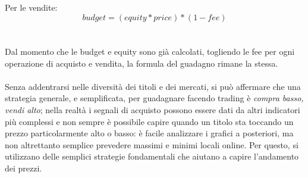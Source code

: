 \documentclass[a4paper,12pt]{report}
\begin{document}
\\~\\
Per le vendite:\\
\begin{equation}
budget=(equity*price)*(1-fee)
\end{equation}
\\~\\ Dal momento che le budget e equity sono già calcolati, togliendo le fee per ogni operazione di acquisto e vendita, la formula del guadagno rimane la stessa.\\~\\
Senza addentrarsi nelle diversità dei titoli e dei mercati, si può affermare che una strategia generale, e semplificata, per guadagnare facendo trading è \textit{compra basso, vendi alto}; nella realtà i segnali di acquisto possono essere dati da altri indicatori più complessi e non sempre è possibile capire quando un titolo sta toccando un prezzo particolarmente alto o basso: è facile analizzare i grafici a posteriori, ma non altrettanto semplice prevedere massimi e minimi locali online. Per questo, si utilizzano delle semplici strategie fondamentali che aiutano a capire l'andamento dei prezzi.
\end{document}
